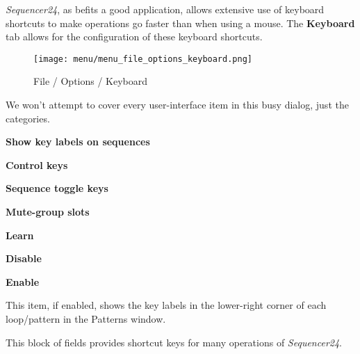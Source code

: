    \textsl{Sequencer24}, as befits a good application, allows extensive use of
   keyboard shortcuts to make operations go faster than when using a mouse.
   The \textbf{Keyboard} tab allows for the configuration of these keyboard
   shortcuts.

\begin{figure}[H]
   \centering 
   \texttt{[image: menu/menu\_file\_options\_keyboard.png]}
   \caption{File / Options / Keyboard}
   \label{fig:seq24_menu_file_options_keyboard}
\end{figure}

   We won't attempt to cover every user-interface item in this busy
   dialog, just the categories.

   \begin{enumber}
      \item \textbf{Show key labels on sequences}
      \item \textbf{Control keys}
      \item \textbf{Sequence toggle keys}
      \item \textbf{Mute-group slots}
      \item \textbf{Learn}
      \item \textbf{Disable}
      \item \textbf{Enable}
   \end{enumber}

   \setcounter{ItemCounter}{0}      %

   This item, if enabled, shows the key labels in the lower-right corner of
   each loop/pattern in the Patterns window.

   This block of fields provides shortcut keys for many operations of
   \textsl{Sequencer24}.

